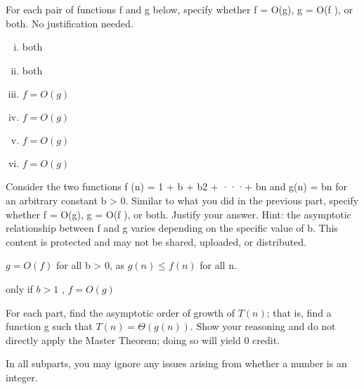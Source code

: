 \documentclass[11pt]{article}
\begin{document}
\begin{subparts}
    \item For each pair of functions f and g below, specify whether f = O(g), g = O(f ), or both.
    No justification needed.\par
    \begin{solution}
        \begin{enumerate}[i.]
            \item both
            \item both
            \item $f=O(g)$
            \item $f=O(g)$
            \item $f=O(g)$
            \item $f=O(g)$
        \end{enumerate}
    \end{solution}

    \item Consider the two functions f (n) = 1 + b + b2 + ···+ bn and g(n) = bn for an arbitrary
    constant b > 0. Similar to what you did in the previous part, specify whether f =
    O(g), g = O(f ), or both. Justify your answer.
    Hint: the asymptotic relationship between f and g varies depending on the specific value
    of b.
    This content is protected and may not be shared, uploaded, or distributed.
    
    \begin{solution} \par
        $g = O(f)$ for all b > 0, as $g(n) ≤ f(n)$ for all n. \par
        only if $b>1$ , $f=O(g)$

    \end{solution}
\end{subparts}


For each part, find the asymptotic order of growth of $T (n)$; that is, find a function g such that
$T (n) = Θ(g(n))$. Show your reasoning and do not directly apply the Master Theorem;
doing so will yield 0 credit. \par
In all subparts, you may ignore any issues arising from whether a number is an integer.
\end{document}

